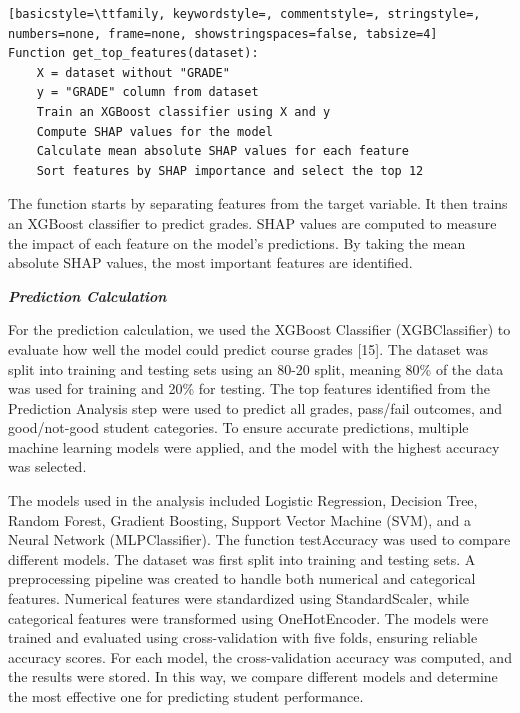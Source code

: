 \begin{lstlisting}[basicstyle=\ttfamily, keywordstyle=, commentstyle=, stringstyle=, numbers=none, frame=none, showstringspaces=false, tabsize=4]
Function get_top_features(dataset):
	X = dataset without "GRADE"
	y = "GRADE" column from dataset
	Train an XGBoost classifier using X and y
	Compute SHAP values for the model
	Calculate mean absolute SHAP values for each feature
	Sort features by SHAP importance and select the top 12
\end{lstlisting}

\begin{multicols}{2}
The function starts by separating features from the target variable. It
then trains an XGBoost classifier to predict grades. SHAP values are
computed to measure the impact of each feature on the model's
predictions. By taking the mean absolute SHAP values, the most important
features are identified.

\emph{{\bfseries Prediction Calculation}}

For the prediction calculation, we used the XGBoost Classifier
(XGBClassifier) to evaluate how well the model could predict course
grades {[}15{]}. The dataset was split into training and testing sets
using an 80-20 split, meaning 80\% of the data was used for training and
20\% for testing. The top features identified from the Prediction
Analysis step were used to predict all grades, pass/fail outcomes, and
good/not-good student categories. To ensure accurate predictions,
multiple machine learning models were applied, and the model with the
highest accuracy was selected.

The models used in the analysis included Logistic Regression, Decision
Tree, Random Forest, Gradient Boosting, Support Vector Machine (SVM),
and a Neural Network (MLPClassifier). The function testAccuracy was used
to compare different models. The dataset was first split into training
and testing sets. A preprocessing pipeline was created to handle both
numerical and categorical features. Numerical features were standardized
using StandardScaler, while categorical features were transformed using
OneHotEncoder. The models were trained and evaluated using
cross-validation with five folds, ensuring reliable accuracy scores. For
each model, the cross-validation accuracy was computed, and the results
were stored. In this way, we compare different models and determine the
most effective one for predicting student performance.


\end{multicols}
